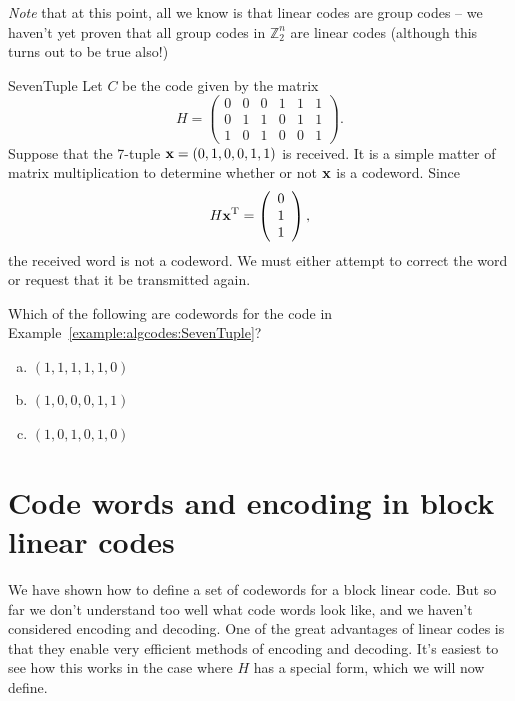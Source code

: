  \noindent
\emph{Note} that at this point, all we know is that linear codes are group codes -- we haven't yet proven that all group codes in $\mathbb{Z}_2^n$ are linear codes (although this turns out to be true also!)
 
\begin{example}{SevenTuple}
Let $C$ be the code given by the matrix
\[
H =
\left(
\begin{array}{cccccc}
0 & 0 & 0 & 1 & 1 & 1 \\
0 & 1 & 1 & 0 & 1 & 1 \\
1 & 0 & 1 & 0 & 0 & 1
\end{array}
\right).
\]
Suppose that the 7-tuple ${\bold x} = (0,1,0,0,1,1)$ is received.
It is a simple matter of matrix multiplication to determine whether or
not ${\bold x}$ is a codeword. Since 
\[
H{\bold x}^{\mathrm{T}} =
\left(
\begin{array}{c}
0 \\
1 \\
1
\end{array}
\right),
\]
the received word is not a codeword.  We must either attempt to
correct the word or request that it be transmitted again.
\end{example}

\begin{exercise}{}
Which of the following are codewords for the code in Example~\ref{example:algcodes:SevenTuple}?
\begin{enumerate}[(a)]
\item
$(1,1,1,1,1,0)$
\item
$(1,0,0,0,1,1)$
\item
$(1,0,1,0,1,0)$
\end{enumerate}
\end{exercise}


 
\section{Code words and encoding in block linear codes}
\label{sec:ErrorAndCorrectionCode:EncodingBlockLinearCodes}
 
We have shown how to define a set of codewords for a block linear code. But so far we don't understand too well what code words look like, and we haven't considered encoding and decoding. One of the great advantages of linear codes is that they enable  very efficient methods of encoding and decoding.  It's easiest to see how this works in the case where $H$ has a special form, which we will now define.

